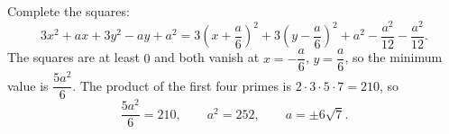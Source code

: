 Complete the squares:
\[3x^2+ax+3y^2-ay+a^2=3\left(x+\dfrac {a}{6}\right)^2+3\left(y-\dfrac {a}{6}\right)^2+a^2-\dfrac{a^2}{12}-\dfrac{a^2}{12}.\]
The squares are at least $0$ and both vanish at $x=-\dfrac {a}{6}$, $y=\dfrac {a}{6}$, so the minimum value is $\dfrac{5a^2}{6}$. The product of the first four primes is $2\cdot3\cdot5\cdot7=210$, so
\[\dfrac{5a^2}{6}=210,\qquad a^2=252,\qquad a=\boxed{\pm6\sqrt7}.\]
